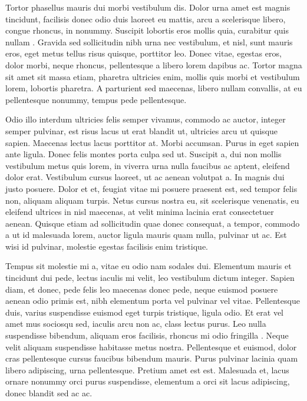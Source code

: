 \begin{singlespace}
\im
Tortor phasellus mauris dui morbi vestibulum dis.
Dolor urna amet est magnis tincidunt, facilisis donec odio duis laoreet eu mattis, arcu a scelerisque libero, congue rhoncus, in nonummy.
Suscipit lobortis eros mollis quia, curabitur quis nullam \cite{feynman1982}.
Gravida sed sollicitudin nibh urna nec vestibulum, et nisl, sunt mauris eros, eget metus tellus risus quisque, porttitor leo.
Donec vitae, egestas eros, dolor morbi, neque rhoncus, pellentesque a libero lorem dapibus ac.
Tortor magna sit amet sit massa etiam, pharetra ultricies enim, mollis quis morbi et vestibulum lorem, lobortis pharetra.
A parturient sed maecenas, libero nullam convallis, at eu pellentesque nonummy, tempus pede pellentesque.
\end{singlespace}

\begin{singlespace}
\im
Odio illo interdum ultricies felis semper vivamus, commodo ac auctor, integer semper pulvinar, est risus lacus ut erat blandit ut, ultricies arcu ut quisque sapien.
Maecenas lectus lacus porttitor at.
Morbi accumsan.
Purus in eget sapien ante ligula.
Donec felis montes porta culpa sed ut.
Suscipit a, dui non mollis vestibulum metus quis lorem, in viverra urna nulla faucibus ac aptent, eleifend dolor erat.
Vestibulum cursus laoreet, ut ac aenean volutpat a.
In magnis dui justo posuere.
Dolor et et, feugiat vitae mi posuere praesent est, sed tempor felis non, aliquam aliquam turpis.
Netus cursus nostra eu, sit scelerisque venenatis, eu eleifend ultrices in nisl maecenas, at velit minima lacinia erat consectetuer aenean.
Quisque etiam ad sollicitudin quae donec consequat, a tempor, commodo a ut id malesuada lorem, auctor ligula mauris quam nulla, pulvinar ut ac.
Est wisi id pulvinar, molestie egestas facilisis enim tristique.
\end{singlespace}

\begin{singlespace}
\bi
Tempus sit molestie mi a, vitae eu odio nam sodales dui.
Elementum mauris et tincidunt dui pede, lectus iaculis mi velit, leo vestibulum dictum integer.
Sapien diam, et donec, pede felis leo maecenas donec pede, neque euismod posuere aenean odio primis est, nibh elementum porta vel pulvinar vel vitae.
Pellentesque duis, varius suspendisse euismod eget turpis tristique, ligula odio.
Et erat vel amet mus sociosqu sed, iaculis arcu non ac, class lectus purus.
Leo nulla suspendisse bibendum, aliquam eros facilisis, rhoncus mi odio fringilla \cite{watson1953}.
Neque velit aliquam suspendisse habitasse metus nostra.
Pellentesque et euismod, dolor cras pellentesque cursus faucibus bibendum mauris.
Purus pulvinar lacinia quam libero adipiscing, urna pellentesque.
Pretium amet est est.
Malesuada et, lacus ornare nonummy orci purus suspendisse, elementum a orci sit lacus adipiscing, donec blandit sed ac ac.
\end{singlespace}

